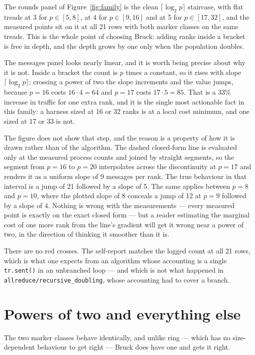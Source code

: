 \documentclass[11pt]{article}
\begin{document}
The rounds panel of Figure~\ref{fig:family} is the clean $\lceil\log_2 p\rceil$ staircase, with
flat treads at 3 for $p \in [5,8]$, at 4 for $p \in [9,16]$ and at 5 for $p \in [17,32]$, and the
measured points sit on it at all 21 rows with both marker classes on the same treads. This is
the whole point of choosing Bruck: adding ranks inside a bracket is free in depth, and the depth
grows by one only when the population doubles.

The messages panel looks nearly linear, and it is worth being precise about why it is not. Inside
a bracket the count is $p$ times a constant, so it rises with slope $\lceil\log_2 p\rceil$;
crossing a power of two the slope increments and the value jumps, because $p=16$ costs $16 \cdot 4
= 64$ and $p=17$ costs $17 \cdot 5 = 85$. That is a 33\% increase in traffic for one extra rank,
and it is the single most actionable fact in this family: a harness sized at 16 or 32 ranks is at
a local cost minimum, and one sized at 17 or 33 is not.

The figure does not show that step, and the reason is a property of how it is drawn rather than of
the algorithm. The dashed closed-form line is evaluated only at the measured process counts and
joined by straight segments, so the segment from $p=16$ to $p=20$ interpolates across the
discontinuity at $p=17$ and renders it as a uniform slope of 9 messages per rank. The true
behaviour in that interval is a jump of 21 followed by a slope of 5. The same applies between
$p=8$ and $p=10$, where the plotted slope of 8 conceals a jump of 12 at $p=9$ followed by a slope
of 4. Nothing is wrong with the measurements --- every measured point is exactly on the exact
closed form --- but a reader estimating the marginal cost of one more rank from the line's
gradient will get it wrong near a power of two, in the direction of thinking it smoother than it
is.

There are no red crosses. The self-report matches the logged count at all 21 rows, which is what
one expects from an algorithm whose accounting is a single \texttt{tr.sent()} in an unbranched
loop --- and which is not what happened in \texttt{allreduce/recursive\_doubling}, whose
accounting had to cover a branch.

\section{Powers of two and everything else}

The two marker classes behave identically, and unlike ring --- which has no size-dependent
behaviour to get right --- Bruck does have one and gets it right.
\end{document}
